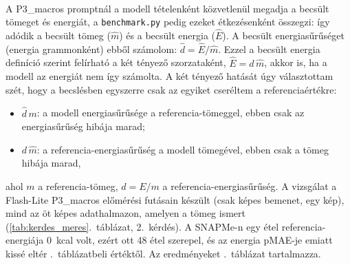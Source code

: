 \paragraph{}A P3\_macros promptnál a modell tételenként közvetlenül megadja a becsült 
tömeget és energiát, a \texttt{benchmark.py} pedig ezeket étkezésenként összegzi: így adódik 
a becsült tömeg ($\hat m$) és a becsült energia ($\hat E$). A becsült energiasűrűséget 
(energia grammonként) ebből számolom: $\hat d = \hat E/\hat m$. Ezzel a becsült energia 
definíció szerint felírható a két tényező szorzataként, $\hat E = \hat d\,\hat m$, akkor 
is, ha a modell az energiát nem így számolta. A két tényező hatását úgy választottam szét, 
hogy a becslésben egyszerre csak az egyiket cseréltem a referenciaértékre:
\begin{itemize}
    \item $\hat d\,m$: a modell energiasűrűsége a referencia-tömeggel, ebben csak az 
    energiasűrűség hibája marad;
    \item $d\,\hat m$: a referencia-energiasűrűség a modell tömegével, ebben csak a tömeg 
    hibája marad,
\end{itemize}
ahol $m$ a referencia-tömeg, $d = E/m$ a referencia-energiasűrűség. A vizsgálat a 
Flash-Lite P3\_macros előmérési futásain készült (csak képes bemenet, egy kép), mind az öt 
képes adathalmazon, amelyen a tömeg ismert (\ref{tab:kerdes_meres}.~táblázat, 2.~kérdés). 
A SNAPMe-n egy étel referencia-energiája 0~kcal volt, ezért ott 48 étel szerepel, és az 
energia pMAE-je emiatt kissé eltér \az{\ref{tab:elomeres_promptok}}.~táblázatbeli értéktől. 
Az eredményeket \az{\ref{tab:hibaforrasok}}.~táblázat tartalmazza.

